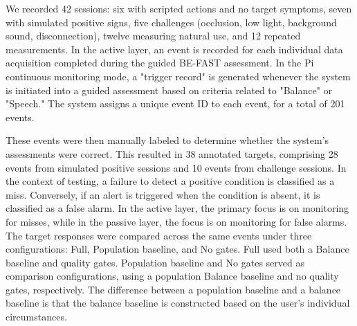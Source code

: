 \documentclass[conference]{IEEEtran}
\begin{document}

We recorded 42 sessions: six with scripted actions and no target
symptoms, seven with simulated positive signs, five challenges
(occlusion, low light, background sound, disconnection), twelve
measuring natural use, and 12 repeated measurements.
In the active layer, an event is recorded for each individual data acquisition completed during the guided BE-FAST assessment. In the Pi continuous monitoring mode, a "trigger record" is generated whenever the system is initiated into a guided assessment based on criteria related to "Balance" or "Speech." The system assigns a unique event ID to each event, for a total of 201 events.

These events were then manually labeled to determine whether the system’s assessments were correct.
This resulted in 38 annotated targets, comprising 28 events from simulated positive sessions and 10 events from challenge sessions.
In the context of testing, a failure to detect a positive condition is classified as a miss.
Conversely, if an alert is triggered when the condition is absent, it is classified as a false alarm. In the active layer, the primary focus is on monitoring for misses, while in the passive layer, the focus is on monitoring for false alarms.
The target responses were compared across the same events under three configurations: Full, Population baseline, and No gates. Full used both a Balance baseline and quality gates. Population baseline and No gates served as comparison configurations, using a population Balance baseline and no quality gates, respectively. The difference between a population baseline and a balance baseline is that the balance baseline is constructed based on the user's individual circumstances.
\end{document}
